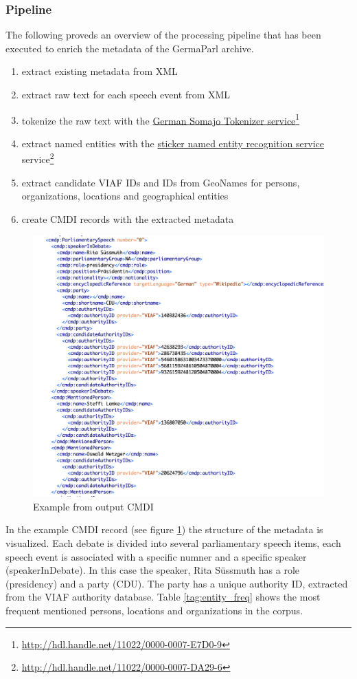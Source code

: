 \documentclass{article}
\begin{document}
\subsubsection{Pipeline}
The following proveds an overview of the processing pipeline that has been executed to enrich the metadata of the GermaParl archive.
\begin{enumerate}
    \item extract existing metadata from XML
    \item extract raw text for each speech event from XML
    \item tokenize the raw text with the \href{http://hdl.handle.net/11022/0000-0007-E7D0-9}{German Somajo Tokenizer service}\footnote{\href{http://hdl.handle.net/11022/0000-0007-E7D0-9}{http://hdl.handle.net/11022/0000-0007-E7D0-9}}
    \item extract named entities with the \href{http://hdl.handle.net/11022/0000-0007-DA29-6}{sticker named entity recognition service} service\footnote{\href{http://hdl.handle.net/11022/0000-0007-DA29-6}{http://hdl.handle.net/11022/0000-0007-DA29-6}}
    \item extract candidate VIAF IDs and IDs from GeoNames for persons, organizations, locations and geographical entities
    \item create CMDI records with the extracted metadata
\end{enumerate}
\begin{figure}
    \centering
    \includegraphics[width=\textwidth]{cmdi1.png}
    \caption{Example from output CMDI}
    \label{fig:cmdi}
\end{figure}
In the example CMDI record (see figure \ref{fig:cmdi}) the structure of the metadata is visualized. Each debate is divided into several parliamentary speech items, each speech event is associated with a specific numner and a specific speaker (speakerInDebate). In this case the speaker, Rita Süssmuth has a role (presidency) and a party (CDU). The party has a unique authority ID, extracted from the VIAF authority database. Table \ref{tag:entity_freq} shows the most frequent mentioned persons, locations and organizations in the corpus.
\end{document}
